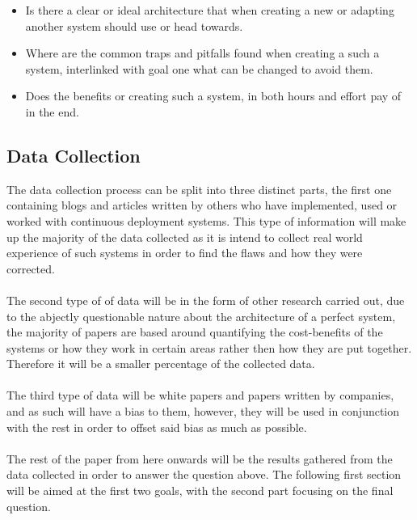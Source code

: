 \begin{itemize}
  \item Is there a clear or ideal architecture that when creating a new or adapting another system should use or head towards.\\
    \item Where are the common traps and pitfalls found when creating a such a system, interlinked  with goal one what can be changed to avoid them.\\
  \item Does the benefits or creating such a system, in both hours and effort pay of in the end. \\
\end{itemize}

\subsection{Data Collection}

The data collection process can be split into three distinct parts, the first one containing blogs and articles written by others who have implemented, used or worked with continuous deployment systems. This type of information will make up the majority of the data collected as it is intend to collect real world experience of such systems in order to find the flaws and how they were corrected.
\\\\
The second type of of data will be in the form of other research carried out, due to the abjectly questionable nature about the architecture of a perfect system, the majority of papers are based around quantifying the cost-benefits of the systems or how they work in certain areas rather then how they are put together. Therefore it will be a smaller percentage of the collected data.
\\\\
The third type of data will be white papers and papers written by companies, and as such will have a bias to them, however, they will be used in conjunction with the rest in order to offset said bias as much as possible.
\\\\
The rest of the paper from here onwards will be the results gathered from the data collected in order to answer the question above. The following first section will be aimed at the first two goals, with the second part focusing on the final question.